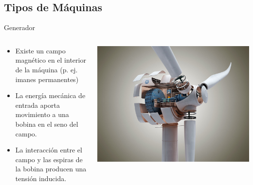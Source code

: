 \documentclass[xcolor={usenames,svgnames,dvipsnames}]{beamer}
\begin{document}
\subsection{Tipos de Máquinas}
\label{sec:orgdf5b194}
\begin{frame}[label={sec:org09f037f}]{Generador}
\begin{columns}
\begin{column}{0.6\columnwidth}
\begin{itemize}
\item Existe un campo magnético en el interior de la máquina (p. ej. imanes permanentes)
\item La energía mecánica de entrada aporta movimiento a una bobina en el seno del campo.
\item La interacción entre el campo y las espiras de la bobina producen una tensión inducida.
\end{itemize}
\end{column}
\begin{column}{0.5\columnwidth}
\begin{center}
\includegraphics[width=.9\linewidth]{../figs/InsideWindTurbine.jpg}
\end{center}
\end{column}
\end{columns}
\end{frame}
\end{document}
